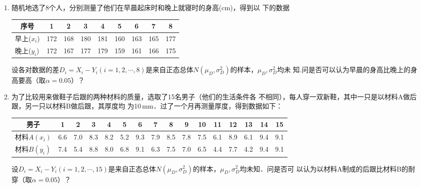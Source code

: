 \begin{enumerate}
    \item 随机地选了8个人，分别测量了他们在早晨起床时和晚上就寝时的身高(cm)，得到以
    下的数据
    \renewcommand{\arraystretch}{1.3}
    \begin{table}[H]\centering
        \begin{tabular}{c|cccccccc}
        \hline
        序号                             & 1                       & 2                       & 3                       & 4   & 5   & 6   & 7   & 8   \\ \hline
        早上($x_i$)                      & 172                     & 168                     & 180                     & 181 & 160 & 163 & 165 & 177 \\ \hline
        \multicolumn{1}{l|}{晚上($y_i$)} & \multicolumn{1}{l}{172} & \multicolumn{1}{l}{167} & \multicolumn{1}{l}{177} & 179 & 159 & 161 & 166 & 175 \\ \hline
        \end{tabular}
    \end{table}
    \renewcommand{\arraystretch}{1.0}
    设各对数据的差$D_i=X_i-Y_i(i=1,2,\cdots,8)$是来自正态总体$N(\mu_D,\sigma^2_D)$的样本，$\mu_D,\sigma^2_D$均未
    知.问是否可以认为早晨的身高比晚上的身高要高（取$\alpha=0.05$）？




    \item 为了比较用来做鞋子后跟的两种材料的质量，选取了15名男子（他们的生活条件各
    不相同），每人穿一双新鞋，其中一只是以材料A做后跟，另一只以材料B做后跟，其厚度均
    为10$\, $mm．过了一个月再测量厚度，得到数据如下：
    \renewcommand{\arraystretch}{1.3}
    \begin{table}[H]\centering
        \small
        \begin{tabular}{c|ccccccccccccccc}
        \hline
        男子                              & 1                       & 2                       & 3                       & 4   & 5   & 6   & 7   & 8   & 9   & 10  & 11  & 12  & 13  & 14  & 15  \\ \hline
        材料$A(x_i)$                      & 6.6                     & 7.0                     & 8.3                     & 8.2 & 5.2 & 9.3 & 7.9 & 8.5 & 7.8 & 7.5 & 6.1 & 8.9 & 6.1 & 9.4 & 9.1 \\ \hline
        \multicolumn{1}{l|}{材料$B(y_i)$} & \multicolumn{1}{l}{7.4} & \multicolumn{1}{l}{5.4} & \multicolumn{1}{l}{8.8} & 8.0 & 6.8 & 9.1 & 6.3 & 7.5 & 7.0 & 6.5 & 4.4 & 7.7 & 4.2 & 9.4 & 9.1 \\ \hline
        \end{tabular}
    \end{table}
    \renewcommand{\arraystretch}{1.0}
    设$D_i=X_i-Y_i(i=1,2,\cdots,15)$是来自正态总体$N(\mu_D,\sigma^2_D)$的样本，$\mu_D,\sigma^2_D$均未知．问是否可
    以认为以材料A制成的后跟比材料B的耐穿（取$\alpha=0.05$）？





\end{enumerate}
